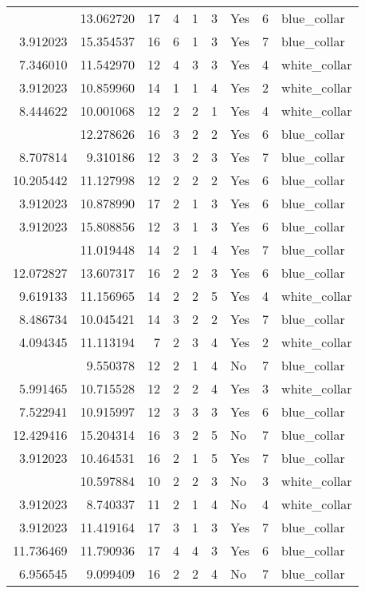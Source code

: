\documentclass[
]{article}
\begin{document}
\begin{longtable}[t]{rrrrrllrl}
\addlinespace
3.912023 & 13.062720 & 17 & 4 & 1 & 3 & Yes & 6 & blue\_collar\\
3.912023 & 15.354537 & 16 & 6 & 1 & 3 & Yes & 7 & blue\_collar\\
7.346010 & 11.542970 & 12 & 4 & 3 & 3 & Yes & 4 & white\_collar\\
3.912023 & 10.859960 & 14 & 1 & 1 & 4 & Yes & 2 & white\_collar\\
8.444622 & 10.001068 & 12 & 2 & 2 & 1 & Yes & 4 & white\_collar\\
\addlinespace
8.993427 & 12.278626 & 16 & 3 & 2 & 2 & Yes & 6 & blue\_collar\\
8.707814 & 9.310186 & 12 & 3 & 2 & 3 & Yes & 7 & blue\_collar\\
10.205442 & 11.127998 & 12 & 2 & 2 & 2 & Yes & 6 & blue\_collar\\
3.912023 & 10.878990 & 17 & 2 & 1 & 3 & Yes & 6 & blue\_collar\\
3.912023 & 15.808856 & 12 & 3 & 1 & 3 & Yes & 6 & blue\_collar\\
\addlinespace
3.912023 & 11.019448 & 14 & 2 & 1 & 4 & Yes & 7 & blue\_collar\\
12.072827 & 13.607317 & 16 & 2 & 2 & 3 & Yes & 6 & blue\_collar\\
9.619133 & 11.156965 & 14 & 2 & 2 & 5 & Yes & 4 & white\_collar\\
8.486734 & 10.045421 & 14 & 3 & 2 & 2 & Yes & 7 & blue\_collar\\
4.094345 & 11.113194 & 7 & 2 & 3 & 4 & Yes & 2 & white\_collar\\
\addlinespace
3.912023 & 9.550378 & 12 & 2 & 1 & 4 & No & 7 & blue\_collar\\
5.991465 & 10.715528 & 12 & 2 & 2 & 4 & Yes & 3 & white\_collar\\
7.522941 & 10.915997 & 12 & 3 & 3 & 3 & Yes & 6 & blue\_collar\\
12.429416 & 15.204314 & 16 & 3 & 2 & 5 & No & 7 & blue\_collar\\
3.912023 & 10.464531 & 16 & 2 & 1 & 5 & Yes & 7 & blue\_collar\\
\addlinespace
5.010635 & 10.597884 & 10 & 2 & 2 & 3 & No & 3 & white\_collar\\
3.912023 & 8.740337 & 11 & 2 & 1 & 4 & No & 4 & white\_collar\\
3.912023 & 11.419164 & 17 & 3 & 1 & 3 & Yes & 7 & blue\_collar\\
11.736469 & 11.790936 & 17 & 4 & 4 & 3 & Yes & 6 & blue\_collar\\
6.956545 & 9.099409 & 16 & 2 & 2 & 4 & No & 7 & blue\_collar\\

\end{longtable}
\end{document}
